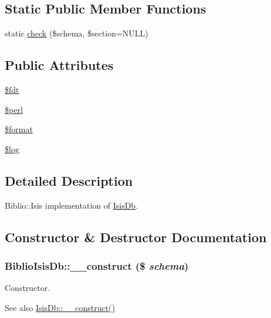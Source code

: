 \subsection*{Static Public Member Functions}
\begin{DoxyCompactItemize}
\item 
static \hyperlink{classBiblioIsisDb_a929467f1907d3aeaeebe493f0c188c5b}{check} (\$schema, \$section=NULL)
\end{DoxyCompactItemize}
\subsection*{Public Attributes}
\begin{DoxyCompactItemize}
\item 
\hyperlink{classBiblioIsisDb_a978a9243ea53b1f2426115d7b4191b07}{\$fdt}
\item 
\hyperlink{classBiblioIsisDb_a7eccfa964dcd1469a263340447c38143}{\$perl}
\item 
\hyperlink{classBiblioIsisDb_ab9fb3b6f10d2734a198ca7802ee38c2d}{\$format}
\item 
\hyperlink{classBiblioIsisDb_a67337d78af0fc21d0ff10471aa638c62}{\$log}
\end{DoxyCompactItemize}


\subsection{Detailed Description}
Biblio::Isis implementation of \hyperlink{interfaceIsisDb}{IsisDb}. 

\subsection{Constructor \& Destructor Documentation}
\hypertarget{classBiblioIsisDb_ab2c5ec782b324847e104d8ad35a230af}{
\subsubsection[{\_\-\_\-construct}]{\setlength{\rightskip}{0pt plus 5cm}BiblioIsisDb::\_\-\_\-construct (\$ {\em schema})}}
\label{classBiblioIsisDb_ab2c5ec782b324847e104d8ad35a230af}
Constructor.

\begin{DoxySeeAlso}{See also}
\hyperlink{interfaceIsisDb_ae1c0a3496d55f710d34c5c19ada7a66b}{IsisDb::\_\-\_\-construct()} 
\end{DoxySeeAlso}


